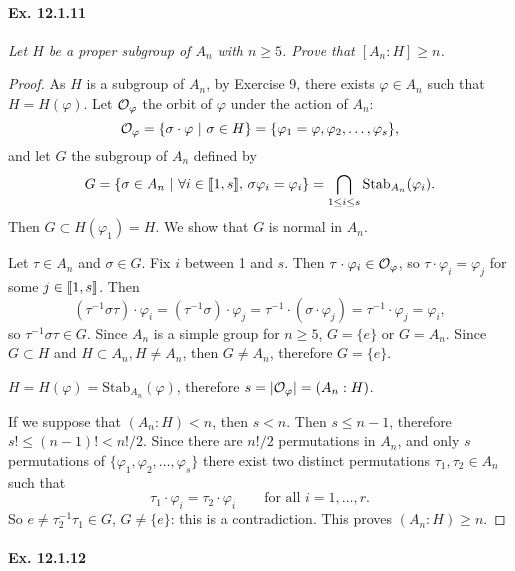 \documentclass[11pt,a4paper]{article}
\def\gcro{\mbox{[\hspace{-.15em}[}}%
\def\dcro{\mbox{]\hspace{-.15em}]}}
\begin{document}
\paragraph{Ex. 12.1.11}

{\it Let $H$ be a proper subgroup of $A_n$ with $n \geq 5$. Prove that $[A_n:H] \geq n$.
}

\begin{proof}
As $H$ is a subgroup of $A_n$, by Exercise 9, there exists $\varphi \in A_n$ such that $H = H(\varphi)$. Let ${\cal O}_{\varphi}$ the orbit of $\varphi$ under the action of $A_n$:
$${\cal O}_{\varphi} = \{\sigma \cdot \varphi\ | \ \sigma \in H\} = \{\varphi_1=\varphi, \varphi_2,\ldots,\varphi_s\},$$
and let $G$ the subgroup of $A_n$ defined by
$$G = \{\sigma \in A_n \ | \ \forall i \in \gcro 1, s \dcro,\, \sigma \varphi_i = \varphi_i\} = \bigcap_{1\leq i \leq s}\mathrm{Stab}_{A_n}(\varphi_i).$$
Then $G \subset H(\varphi_1) = H$. We show that $G$ is normal in $A_n$. 

Let $\tau \in A_n$ and $\sigma \in G$. Fix $i$ between 1 and $s$. Then $\tau \cdot \varphi_i \in {\cal O}_{\varphi}$, so $\tau \cdot \varphi_i = \varphi_j$ for some $j \in \gcro 1, s \dcro$. Then
$$(\tau^{-1} \sigma \tau)\cdot \varphi_i = (\tau^{-1} \sigma)\cdot \varphi_j = \tau^{-1} \cdot (\sigma \cdot \varphi_j) = \tau^{-1} \cdot \varphi_j = \varphi_i,$$
so $\tau^{-1} \sigma \tau \in G$.
Since $A_n$ is a simple group for $n\geq 5$, $G =\{e\}$ or $G = A_n$. Since $G \subset H$ and $H \subset A_n,H\ne A_n$, then $G \ne A_n$, therefore $G = \{e\}$.

$H = H(\varphi) = \mathrm{Stab}_{A_n}(\varphi)$, therefore $s = |{\cal O}_{\varphi}| = (A_n : H)$.

If we suppose that $(A_n:H) < n$, then $s<n$. Then $s \leq n-1$, therefore $s! \leq (n-1)! < n!/2$. Since there are $n!/2$ permutations in $A_n$, and only $s$ permutations of $ \{\varphi_1, \varphi_2,\ldots,\varphi_s\}$ there exist two distinct permutations $\tau_1,\tau_2 \in A_n$ such that
$$\tau_1\cdot \varphi_i = \tau_2 \cdot \varphi _i \qquad \text{for all } i=1,\ldots,r.$$
So $e \ne \tau_2^{-1} \tau_1 \in G$, $G \ne \{e\}$: this is a contradiction. This proves $(A_n:H) \geq n$.
\end{proof}

\paragraph{Ex. 12.1.12}
\end{document}
